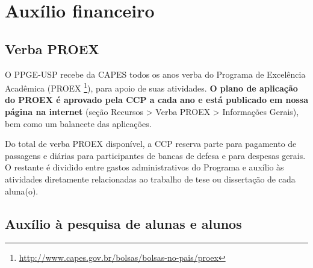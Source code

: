 \documentclass[twoside a4paper 12pt]{report}
\begin{document}

\section{Auxílio financeiro}

\subsection{Verba PROEX}

O PPGE-USP recebe da CAPES todos os anos verba do Programa de
Excelência Acadêmica (PROEX
\footnote{\url{http://www.capes.gov.br/bolsas/bolsas-no-pais/proex}}),
para apoio de suas atividades. \textbf{O plano de aplicação do PROEX é
  aprovado pela CCP a cada ano e está publicado em nossa página na
  internet} (seção Recursos \textgreater{} Verba PROEX \textgreater{}
Informações Gerais), bem como um balancete das aplicações.

Do total de verba PROEX disponível, a CCP reserva parte para pagamento
de passagens e diárias para participantes de bancas de defesa e para
despesas gerais. O restante é dividido entre gastos administrativos do
Programa e auxílio às atividades diretamente relacionadas ao trabalho
de tese ou dissertação de cada aluna(o).

\subsection{Auxílio à pesquisa de alunas e alunos
}\label{auxilio-pesquisa-de-alunas-e-alunos}
\end{document}
